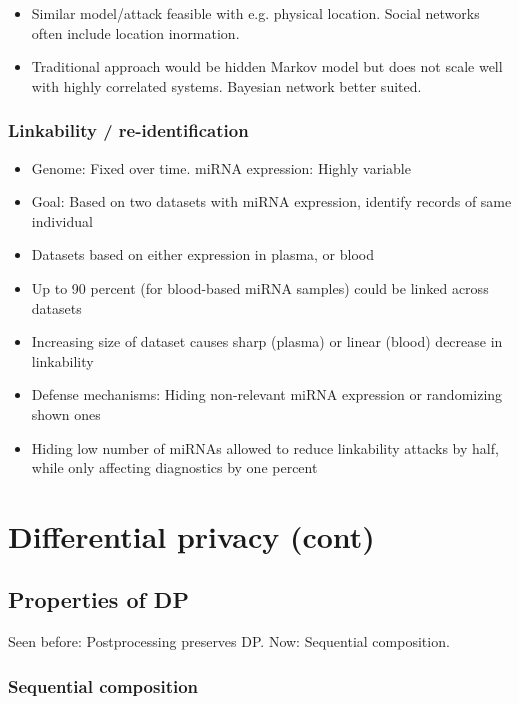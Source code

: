 \documentclass[a4paper]{scrreprt}
\begin{document}
\begin{itemize}
		\item Similar model/attack feasible with e.g. physical location. Social
				networks often include location inormation.
		\item Traditional approach would be hidden Markov model but does not
				scale well with highly correlated systems. Bayesian network
				better suited.
\end{itemize}

\subsection{Linkability / re-identification}

\begin{itemize}
		\item Genome: Fixed over time. miRNA expression: Highly variable
		\item Goal: Based on two datasets with miRNA expression, identify records of same individual
		\item Datasets based on either expression in plasma, or blood
		\item Up to 90 percent (for blood-based miRNA samples) could be linked across datasets
		\item Increasing size of dataset causes sharp (plasma) or linear (blood) decrease in linkability
		\item Defense mechanisms: Hiding non-relevant miRNA expression or randomizing shown ones
		\item Hiding low number of miRNAs allowed to reduce linkability attacks
				by half, while only affecting diagnostics by one percent
\end{itemize}

\chapter{Differential privacy (cont)}

\section{Properties of DP}

Seen before: Postprocessing preserves DP. Now: Sequential composition.

\subsection{Sequential composition}
\end{document}

